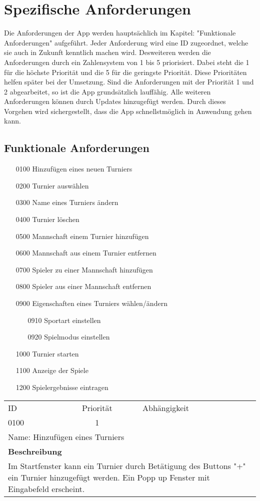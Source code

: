 \chapter{Spezifische Anforderungen}
Die Anforderungen der App werden hauptsächlich im Kapitel: "Funktionale Anforderungen" aufgeführt. Jeder Anforderung wird eine ID zugeordnet, welche sie auch in Zukunft kenntlich machen wird.
Desweiteren werden die Anforderungen durch ein Zahlensystem von 1 bis 5 priorisiert. Dabei steht die 1 für die höchste Priorität und die 5 für die geringste Priorität. Diese Prioritäten helfen später bei der Umsetzung. Sind die Anforderungen mit der Priorität 1 und 2 abgearbeitet, so ist die App grundsätzlich lauffähig. Alle weiteren Anforderungen können durch Updates hinzugefügt  werden. Durch dieses Vorgehen wird sichergestellt, dass die App schnellstmöglich in Anwendung gehen kann.

\section{Funktionale Anforderungen}
	\begin{itemize}
		\item[0100] Hinzufügen eines neuen Turniers
		\item[0200] Turnier auswählen
		\item[0300] Name eines Turniers ändern
		\item[0400] Turnier löschen
		\item[0500] Mannschaft einem Turnier hinzufügen
		\item[0600] Mannschaft aus einem Turnier entfernen
		\item[0700] Spieler zu einer Mannschaft hinzufügen
		\item[0800] Spieler aus einer Mannschaft entfernen
		\item[0900] Eigenschaften eines Turniers wählen/ändern
		\begin{itemize}
			\item[0910] Sportart einstellen
			\item[0920] Spielmodus einstellen
		\end{itemize}
		\item[1000] Turnier starten
		\item[1100] Anzeige der Spiele
		\item[1200] Spielergebnisse eintragen
	\end{itemize}
	
	\begin{tabularx}{\textwidth}{|l|c|l|}
		\hline
		ID & Priorität & Abhängigkeit \\
		0100 & 1 & \\
		\hline
		\multicolumn{3}{|l|}{Name: Hinzufügen eines Turniers} \\
		\hline		
		\multicolumn{3}{|l|}{\textbf{Beschreibung}}\\
		\multicolumn{3}{|X|}{Im Startfenster kann ein Turnier durch Betätigung des Buttons "+" ein Turnier hinzugefügt werden. Ein Popp up Fenster mit Eingabefeld erscheint.}\\
		\hline		 
	\end{tabularx}
	
